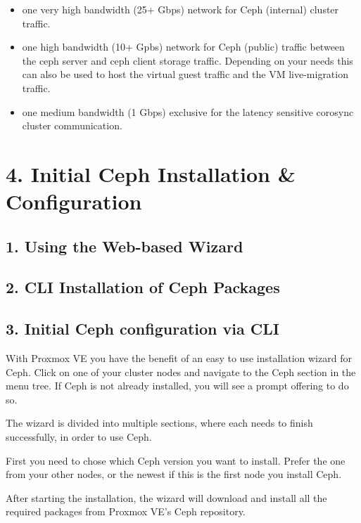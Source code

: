 \begin{itemize}[leftmargin=2cm]

	\item one very high bandwidth (25+ Gbps) network for Ceph (internal) cluster traffic.

	\item one high bandwidth (10+ Gpbs) network for Ceph (public) traffic between the ceph server and ceph client storage traffic. Depending on your needs this can also be used to host the virtual guest traffic and the VM live-migration traffic.

	\item one medium bandwidth (1 Gbps) exclusive for the latency sensitive corosync cluster communication.

\end{itemize}


\section{4. Initial Ceph Installation & Configuration}

\subsection{1. Using the Web-based Wizard}

\subsection{2. CLI Installation of Ceph Packages}

\subsection{3. Initial Ceph configuration via CLI}

With Proxmox VE you have the benefit of an easy to use installation wizard for Ceph. Click on one of your cluster nodes and navigate to the Ceph section in the menu tree. If Ceph is not already installed, you will see a prompt offering to do so.

The wizard is divided into multiple sections, where each needs to finish successfully, in order to use Ceph.

First you need to chose which Ceph version you want to install. Prefer the one from your other nodes, or the newest if this is the first node you install Ceph.

After starting the installation, the wizard will download and install all the required packages from Proxmox VE’s Ceph repository.

